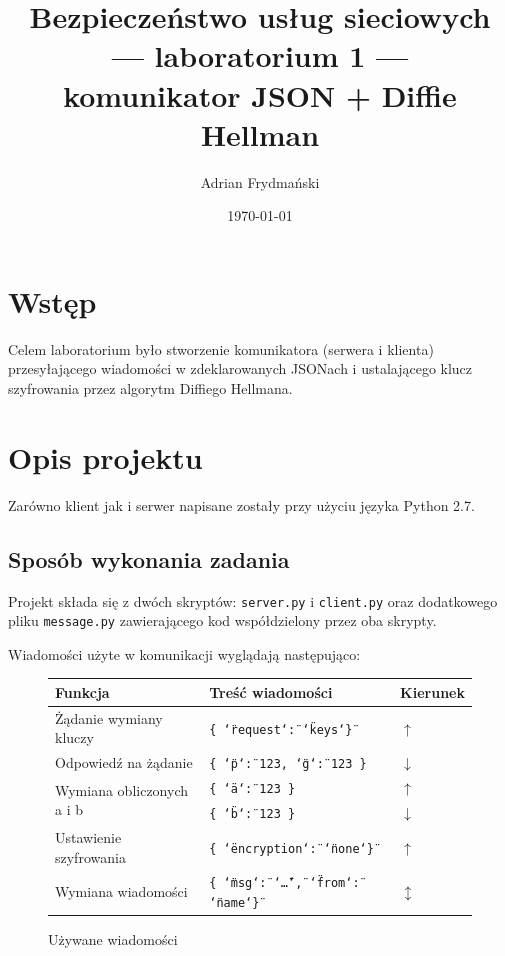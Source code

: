 \documentclass[a4paper]{article}
\title{Bezpieczeństwo usług sieciowych \\ --- laboratorium 1 --- \\ komunikator JSON + Diffie Hellman}
\author{Adrian Frydmański}
\date{\today}
\begin{document}
\maketitle

\section{Wstęp}
Celem laboratorium było stworzenie komunikatora (serwera i klienta) przesyłającego wiadomości w zdeklarowanych JSONach i ustalającego klucz szyfrowania przez algorytm Diffiego Hellmana.

\section{Opis projektu}
Zarówno klient jak i serwer napisane zostały przy użyciu języka Python 2.7.

\subsection{Sposób wykonania zadania}
Projekt składa się z dwóch skryptów: \texttt{server.py} i \texttt{client.py} oraz dodatkowego pliku \texttt{message.py} zawierającego kod współdzielony przez oba skrypty.

Wiadomości użyte w komunikacji wyglądają następująco:

\begin{figure}[H]
	\center
	\begin{tabular}{|l|l|l|}
		\hline 
		\textbf{Funkcja} & \textbf{Treść wiadomości} & \textbf{Kierunek} \\ 
		\hline 
		Żądanie wymiany kluczy & \texttt{\{ \char`\"request\char`\": \char`\"keys\char`\" \}} & $\uparrow$  \\ 
		\hline 
		Odpowiedź na żądanie & \texttt{\{ \char`\"p\char`\": 123, \char`\"g\char`\": 123 \}} & $\downarrow$ \\ 
		\hline 
		\multirow{ 2}{*}{Wymiana obliczonych a i b} & \texttt{\{ \char`\"a\char`\": 123 \}} & $\uparrow$ \\\cline{2-3} 
		& \texttt{\{ \char`\"b\char`\": 123 \}} & $\downarrow$ \\ 
		\hline 
		Ustawienie szyfrowania & \texttt{\{ \char`\"encryption\char`\": \char`\"none\char`\" \}} & $\uparrow$ \\ 
		\hline 
		Wymiana wiadomości & \texttt{\{ \char`\"msg\char`\": \char`\"\ldots\char`\", \char`\"from\char`\": \char`\"name\char`\" \}} & $\updownarrow$ \\ 
		\hline 
	\end{tabular} 
	\caption{Używane wiadomości}
\end{figure}
\end{document}
